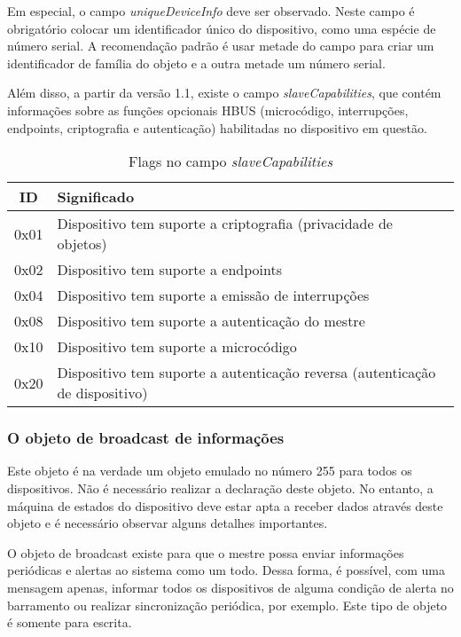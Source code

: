 Em especial, o campo \textit{uniqueDeviceInfo} deve ser observado. Neste campo é obrigatório colocar um identificador único do dispositivo, como uma espécie de número serial. A recomendação padrão é usar metade do campo para criar um identificador de família do objeto e a outra metade um número serial.

Além disso, a partir da versão 1.1, existe o campo \textit{slaveCapabilities}, que contém informações sobre as funções opcionais HBUS (microcódigo, interrupções, endpoints, criptografia e autenticação) habilitadas no dispositivo em questão.

\begin{table}[H]
\centering
\caption{Flags no campo \textit{slaveCapabilities}}
\begin{tabular}{c p{13cm}}
\hline
ID		&	Significado\\
\hline
0x01		&	Dispositivo tem suporte a criptografia (privacidade de objetos)\\
0x02		&	Dispositivo tem suporte a endpoints\\
0x04		&	Dispositivo tem suporte a emissão de interrupções\\
0x08		&	Dispositivo tem suporte a autenticação do mestre\\
0x10		&	Dispositivo tem suporte a microcódigo\\
0x20		&	Dispositivo tem suporte a autenticação reversa (autenticação de dispositivo)\\
\hline
\end{tabular}
\end{table}

\subsubsection*{O objeto de broadcast de informações}

Este objeto é na verdade um objeto emulado no número 255 para todos os dispositivos. Não é necessário realizar a declaração deste objeto. No entanto, a máquina de estados do dispositivo deve estar apta a receber dados através deste objeto e é necessário observar alguns detalhes importantes.

O objeto de broadcast existe para que o mestre possa enviar informações periódicas e alertas ao sistema como um todo. Dessa forma, é possível, com uma mensagem apenas, informar todos os dispositivos de alguma condição de alerta no barramento ou realizar sincronização periódica, por exemplo. Este tipo de objeto é somente para escrita.

